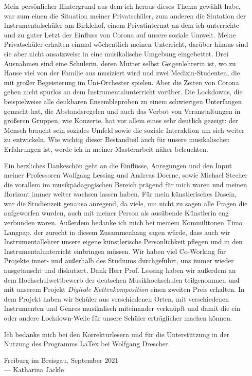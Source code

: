 
Mein persönlicher Hintergrund aus dem ich heraus dieses Thema gewählt habe, war
zum einen die Situation meiner Privatschüler, zum anderen die Siutation der
Instrumentalschüler am Birklehof, einem Privatinternat an dem ich unterrichte
und zu guter Letzt der Einfluss von Corona auf unsere soziale Umwelt. Meine
Privatschüler erhalten einmal wöchentlich meinen Unterricht, darüber hinaus sind
sie aber nicht ansatzweise in eine musikalische Umgebung eingebettet. Drei
Ausnahmen sind eine Schülerin, deren Mutter selbst Geigenlehrerin ist, wo zu
Hause viel von der Familie aus musiziert wird und zwei Medizin-Studenten, die
mit großer Begeisterung im Uni-Orchester spielen. Aber die Zeiten von Corona
gehen nicht spurlos an dem Instrumentalunterricht vorüber. Die Lockdowns, die
beispielweise alle denkbaren Ensembleproben zu einem schwierigen Unterfangen
gemacht hat, die Abstandsregelen und auch das Verbot von Veranstaltungen in
größeren Gruppen, wie Konzerte, hat vor allem eines sehr deutlich gezeigt: der
Mensch braucht sein soziales Umfeld sowie die soziale Interaktion um sich weiter
zu entwickeln. Wie wichtig dieser Bestandteil auch für unsere musikalischen
Erfahrungen ist, werde ich in meiner Masterarbeit näher beleuchten.

Ein herzliches Dankeschön geht an die Einflüsse, Anregungen und den Input meiner
Professoren Wolfgang Lessing und Andreas Doerne, sowie Michael Stecher die
vorallem im musikpädagogischen Bereich prägend für mich waren und meinen
Horizont immer weiter wachsen lassen haben. Für mein künstlerisches Dasein, war
die Studienzeit genauso anregend, da viele, um nicht zu sagen alle Fragen die
aufgeworfen wurden, auch mit meiner Person als ausübende Künstlerin eng
verbunden waren. Außerdem bedanke ich mich bei meinem Kommilitonen Timo Langpap,
der zurecht in diesem Zusammenhang sagen würde, dass auch wir Instrumentallehrer
unsere eigene künstlerische Persönlichkeit pflegen und in den
Instrumentalunterricht einbringen müssen. Wir haben viel Co-Working für Projekte
inner- und außerhalb des Studiums durchgeführt, uns immer wieder ausgetauscht und
diskutiert.
Dank Herr Prof. Lessing haben wir außerdem an dem Hochschulwettbewerb der
deutschen Musikhochschulen teilgenommen und mit unserem Projekt \emph{Digitale
Kettenkomposition} einen zweiten Preis erhalten. In dem Projekt haben wir
Schüler aus verschiedenen Orten, mit verschiedenen Instrumenten und Genres
musikalisch miteinander verknüpft und damit die ein oder andere Lockdown-Welle
für unsere Schüler erträglicher machen können. 

Ich bedanke mich bei den Korrekturlesern und für die
Unterstützung in der Nutzung des Programms LaTex bei Wolfgang Drescher.




\vspace{0.5cm}

\begin{flushright}
	{
		\small
		Freiburg im Breisgau, September 2021\\
		--- Katharina Jäckle
	}
\end{flushright}
